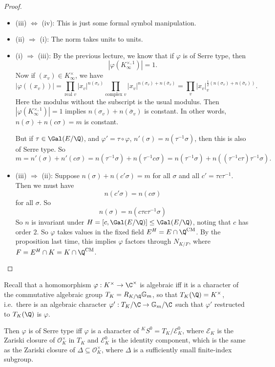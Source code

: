 \documentclass[a4paper]{article}
\renewcommand\G{\mathbb{G}}
\newcommand\CM{\mathrm{CM}}
\begin{document}
\begin{proof}\leavevmode
  \begin{itemize}
    \item (iii) $\Leftrightarrow$ (iv): This is just some formal symbol manipulation.
    \item (ii) $\Rightarrow$ (i): The norm takes units to units.
    \item (i) $\Rightarrow$ (iii): By the previous lecture, we know that if $\varphi$ is of Serre type, then
      \[
        |\varphi(K_\infty^{\times, 1})| = 1.
      \]
      Now if $(x_v) \in K_\infty^\times$, we have
      \[
        |\varphi((x_v))| = \prod_{\text{real }v} |x_v|^{n(\sigma_v)} \prod_{\text{complex }v} |x_v|^{n(\sigma_v) + n(\bar{\sigma}_v)} = \prod_v |x_v|_v^{\frac{1}{2} (n(\sigma_v) + n(\bar{\sigma}_v))}.
      \]
      Here the modulus without the subscript is the usual modulus. Then $|\varphi(K_\infty^{\times, 1})| = 1$ implies $n(\sigma_v) + n(\bar{\sigma}_v)$ is constant. In other words, $n(\sigma) + n(c\sigma) = m$ is constant.

      But if $\tau \in \Gal(E/\Q)$, and $\varphi' = \tau \circ \varphi$, $n'(\sigma) = n(\tau^{-1}\sigma)$, then this is also of Serre type. So
      \[
        m = n'(\sigma) + n'(c\sigma) = n(\tau^{-1} \sigma) + n(\tau^{-1} c \sigma) = n(\tau^{-1} \sigma) + n((\tau^{-1} c \tau) \tau^{-1} \sigma).
      \]
    \item (iii) $\Rightarrow$ (ii): Suppose $n(\sigma) + n(c'\sigma) = m$ for all $\sigma$ and all $c' = \tau c \tau^{-1}$. Then we must have
      \[
        n(c'\sigma) = n(c\sigma)
      \]
      for all $\sigma$. So
      \[
        n(\sigma) = n(c\tau c \tau^{-1} \sigma)
      \]
      So $n$ is invariant under $H = [c, \Gal(E/\Q)] \leq \Gal(E/\Q)$, noting that $c$ has order $2$. So $\varphi$ takes values in the fixed field $E^H = E \cap \Q^{\CM}$. By the proposition last time, this implies $\varphi$ factors through $N_{K/F}$, where $F = E^H \cap K = K \cap \Q^{\CM}$.\qedhere
  \end{itemize}
\end{proof}
Recall that a homomorphism $\varphi: K^\times \to \C^\times$ is algebraic iff it is a character of the commutative algebraic group $T_K = R_{K/\Q} \G_m$, so that $T_K(\Q) = K^\times$, i.e.\ there is an algebraic character $\varphi': T_K/\C \to \G_m/\C$ such that $\varphi'$ restructed to $T_K(\Q)$ is $\varphi$.

Then $\varphi$ is of Serre type iff $\varphi$ is a character of $^KS^0 = T_K/\mathcal{E}_K^0$, where $\mathcal{E}_K$ is the Zariski closure of $\mathcal{O}_K^\times$ in $T_K$ and $\mathcal{E}_K^0$ is the identity component, which is the same as the Zariski closure of $\Delta \subseteq \mathcal{O}_K^\times$, where $\Delta$ is a sufficiently small finite-index subgroup.
\end{document}
